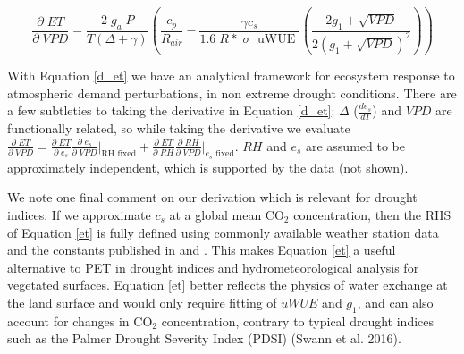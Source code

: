 \documentclass[draft,linenumbers]{agujournal}
\begin{document}
\begin{linenomath*}
  \begin{equation}
    \frac{\partial \;  ET}{\partial \; VPD} = \frac{2\; g_a \; P}{T(\Delta + \gamma)}   \left(\frac{ c_p}{R_{air}} -  \frac{\gamma c_s }{1.6 \; R*\; \sigma \; \text{ uWUE }} \left( \frac{2 g_1 + \sqrt{VPD}}{2 (g_1 + \sqrt{VPD})^2}\right) \right)
    \label{d_et}
  \end{equation}
\end{linenomath*}

With Equation \ref{d_et} we have an analytical framework for ecosystem response to atmospheric demand perturbations, in non extreme drought conditions. There are a few subtleties to taking the derivative in Equation \ref{d_et}: $\Delta$ ($\frac{d e_{s}}{d T}$) and $VPD$ are functionally related, so while taking the derivative we evaluate $\frac{\partial \; ET}{\partial \; VPD} = \frac{\partial \; ET} {\partial \; e_s} \frac{\partial \; e_s}{\partial \; VPD} \Big|_{\text{RH fixed}} + \frac{\partial \; ET}{\partial \; RH} \frac{\partial \; RH}{\partial \; VPD} \Big|_{\text{$e_s$ fixed}}$. $RH$ and $e_s$ are assumed to be approximately independent, which is supported by the data (not shown). 

We note one final comment on our derivation which is relevant for drought indices. If we approximate $c_s$ at a global mean CO$_2$ concentration, then the RHS of Equation \ref{et} is fully defined using commonly available weather station data and the constants published in \citet{Zhou_2015} and \citet{Lin_2015}. This makes Equation \ref{et} a useful alternative to PET in drought indices and hydrometeorological analysis for vegetated surfaces. Equation \ref{et} better reflects the physics of water exchange at the land surface and would only require fitting of $uWUE$ and $g_1$, and can also account for changes in CO$_2$ concentration, contrary to typical drought indices such as the Palmer Drought Severity Index (PDSI) (Swann et al. 2016).
\end{document}
